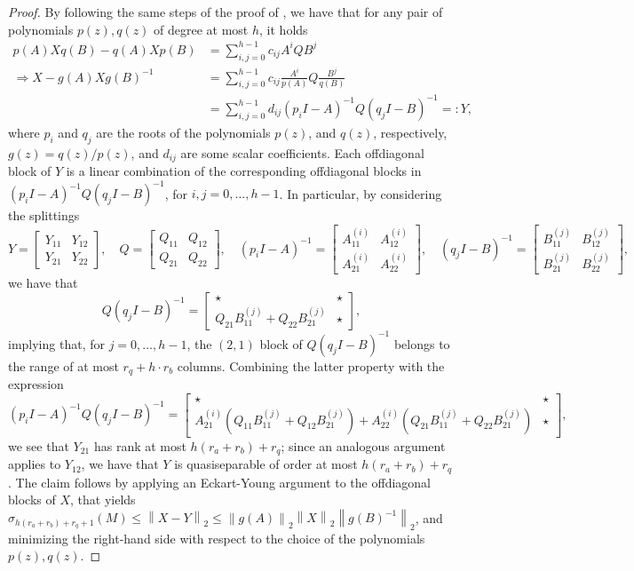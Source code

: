 \documentclass[a4paper,10pt]{article}
\newcommand{\norm}[1]{\left\lVert#1\right\rVert}
\begin{document}
\begin{proof}
By following the same steps of the proof of \cite[Theorem 2.1]{beckermann17}, we have that for any pair of polynomials $p(z),q(z)$ of degree at most $h$, it holds
\begin{align*}
p(A)Xq(B)-q(A)Xp(B)&=\sum_{i,j=0}^{h-1} c_{ij}A^iQB^j\\
\Rightarrow X - g(A)Xg(B)^{-1}&=\sum_{i,j=0}^{h-1} c_{ij}\frac{A^i}{p(A)}Q\frac{B^j}{q(B)}\\
&=\sum_{i,j=0}^{h-1} d_{ij}(p_i I -A)^{-1}Q(q_jI-B)^{-1}=:Y,
\end{align*}
where $p_i$ and $q_j$ are the roots of the polynomials $p(z)$, and $q(z)$, respectively, $g(z)=q(z)/p(z)$, and $d_{ij}$ are some scalar coefficients. Each offdiagonal block of $Y$ is a linear combination of the corresponding offdiagonal blocks in $(p_i I -A)^{-1}Q(q_jI-B)^{-1}$, for $i,j=0,\dots, h-1$. In particular, by considering the splittings
$$
Y=\begin{bmatrix}
	Y_{11}& Y_{12}\\
	Y_{21}&Y_{22}
\end{bmatrix},\quad 
Q=\begin{bmatrix}
	Q_{11}& Q_{12}\\
	Q_{21}&Q_{22}
\end{bmatrix},\quad (p_i I - A)^{-1}=\begin{bmatrix}
A^{(i)}_{11}& A^{(i)}_{12}\\
A^{(i)}_{21}&A^{(i)}_{22}
\end{bmatrix},\quad (q_jI-B)^{-1}=\begin{bmatrix}
B^{(j)}_{11}& B^{(j)}_{12}\\
B^{(j)}_{21}&B^{(j)}_{22}
\end{bmatrix},
$$ 
we have that
$$
Q(q_jI-B)^{-1}=\begin{bmatrix}
	\star &\star\\
Q_{21}B^{(j)}_{11}+ Q_{22}B^{(j)}_{21}	&\star
\end{bmatrix},
$$
implying that, for $j=0,\dots, h-1$, the $(2,1)$ block of $Q(q_jI-B)^{-1}$ belongs to the range of at most $r_q+h\cdot r_b$ columns. Combining the latter property with the expression
$$
(p_iI -A)^{-1}Q(q_jI-B)^{-1}=\begin{bmatrix}
	\star &\star\\
	A^{(i)}_{21}(Q_{11}B^{(j)}_{11}+ Q_{12}B^{(j)}_{21}) +A^{(i)}_{22}(Q_{21}B^{(j)}_{11}+ Q_{22}B^{(j)}_{21})	&\star
\end{bmatrix},
$$
we see that $Y_{21}$ has rank at most $h(r_a+r_b)+r_q$; since an analogous argument applies to $Y_{12}$, we have that $Y$ is quasiseparable of order at most $h(r_a+r_b)+r_q$. The claim follows by applying an Eckart-Young argument to the offdiagonal blocks of $X$, that yields $\sigma_{h(r_a+r_b)+r_q+1}(M)\le\norm{X-Y}_2\le \norm{g(A)}_2\norm{X}_2\norm{g(B)^{-1}}_2$, and minimizing the right-hand side with respect to the choice of the polynomials $p(z),q(z)$.
\end{proof}
\end{document}
